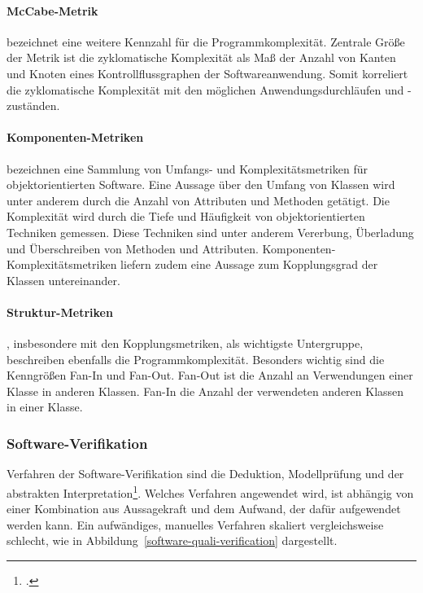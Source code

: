 \paragraph{McCabe-Metrik} bezeichnet eine weitere Kennzahl für die Programmkomplexität. Zentrale Größe der Metrik ist die \glqq zyklomatische Komplexität\grqq{} als Maß der Anzahl von Kanten und Knoten eines Kontrollflussgraphen der Softwareanwendung. Somit korreliert die zyklomatische Komplexität mit den möglichen Anwendungsdurchläufen und -zuständen.

\paragraph{Komponenten-Metriken} bezeichnen eine Sammlung von Umfangs- und Komplexitätsmetriken für objektorientierten Software. Eine Aussage über den Umfang von Klassen wird unter anderem durch die Anzahl von Attributen und Methoden getätigt. Die Komplexität wird durch die Tiefe und Häufigkeit von objektorientierten Techniken gemessen. Diese Techniken sind unter anderem Vererbung, Überladung und Überschreiben von Methoden und Attributen. Komponenten-Komplexitätsmetriken liefern zudem eine Aussage zum Kopplungsgrad der Klassen untereinander.

\paragraph{Struktur-Metriken}\label{par:structure-metrics}, insbesondere mit den Kopplungsmetriken, als wichtigste Untergruppe, beschreiben ebenfalls die Programmkomplexität. Besonders wichtig sind die Kenngrößen Fan-In und Fan-Out. Fan-Out ist die Anzahl an Verwendungen einer Klasse in anderen Klassen. Fan-In die Anzahl der verwendeten anderen Klassen in einer Klasse. 

\subsubsection{Software-Verifikation}
\label{subsubsec:base-verification}
Verfahren der Software-Verifikation sind die Deduktion, Modellprüfung und der abstrakten Interpretation\footcite[S. 333 ff][]{software-quality2008}. Welches Verfahren angewendet wird, ist abhängig von einer Kombination aus Aussagekraft und dem Aufwand, der dafür aufgewendet werden kann. Ein aufwändiges, manuelles Verfahren skaliert vergleichsweise schlecht, wie in Abbildung~\ref{software-quali-verification} dargestellt.

